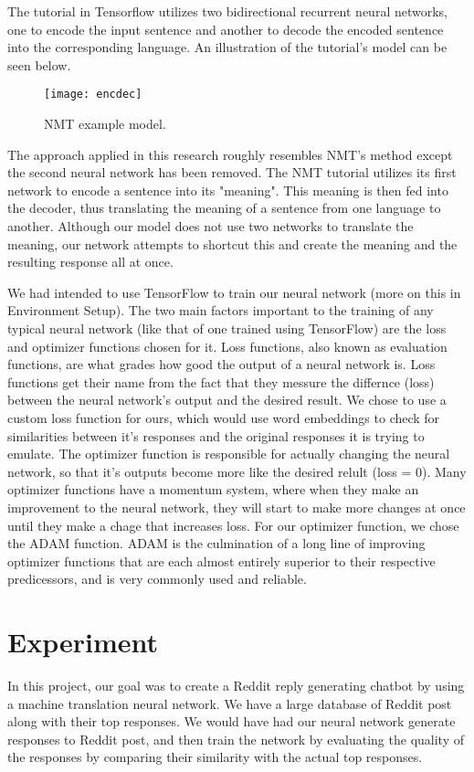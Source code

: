 \documentclass[11pt,twocolumn]{article}
\begin{document}
The tutorial in Tensorflow utilizes two bidirectional recurrent neural networks, one to encode the input sentence and another to decode the encoded sentence into the corresponding language.  An illustration of the tutorial's model can be seen below.
\begin{figure}[htp]
    \centering
        \texttt{[image: encdec]}
        \caption{NMT example model. \cite{Tensorflowtutorial}}
        \label{fig:encdec}
\end{figure}
The approach applied in this research roughly resembles NMT's method except the second neural network has been removed.  The NMT tutorial utilizes its first network to encode a sentence into its "meaning".  This meaning is then fed into the decoder, thus translating the meaning of a sentence from one language to another.  Although our model does not use two networks to translate the meaning, our network attempts to shortcut this and create the meaning and the resulting response all at once.

We had intended to use TensorFlow to train our neural network (more on this in Environment Setup).  The two main factors important to the training of any typical neural network (like that of one trained using TensorFlow) are the loss and optimizer functions chosen for it.  Loss functions, also known as evaluation functions, are what grades how good the output of a neural network is.  Loss functions get their name from the fact that they messure the differnce (loss) between the neural network's output and the desired result.  We chose to use a custom loss function for ours, which would use word embeddings to check for similarities between it's responses and the original responses it is trying to emulate.  The optimizer function is responsible for actually changing the neural network, so that it's outputs become more like the desired relult (loss = 0).  Many optimizer functions have a momentum system, where when they make an improvement to the neural network, they will start to make more changes at once until they make a chage that increases loss.  For our optimizer function, we chose the ADAM function.  ADAM is the culmination of a long line of improving optimizer functions that are each almost entirely superior to their respective predicessors, and is very commonly used and reliable.

\section{Experiment}
In this project, our goal was to create a Reddit reply generating chatbot by using a machine translation neural network.  We have a large database of Reddit post along with their top responses.  We would have had our neural network generate responses to Reddit post, and then train the network by evaluating the quality of the responses by comparing their similarity with the actual top responses.
\end{document}
